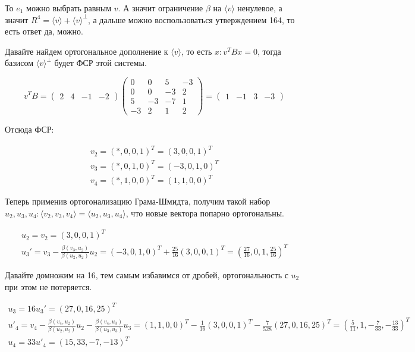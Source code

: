 \documentclass[11pt]{article}
\begin{document}
То $e_1$ можно выбрать равным $v$. А значит ограничение $\beta$ на $\langle v \rangle$ ненулевое, а значит $R^4 = \langle v \rangle + \langle v \rangle^\perp$, а дальше можно воспользоваться утверждением 164, то есть ответ да, можно.

Давайте найдем ортогональное дополнение к $\langle v \rangle$, то есть $x : v^T B x = 0$, тогда базисом $\langle v \rangle^\perp$ будет ФСР этой системы.

$$
v^TB =
\begin{pmatrix}2&4&-1&-2\end{pmatrix}
\begin{pmatrix}
0 & 0 & 5 & -3\\
0 & 0 & -3 & 2\\
5 & -3 & -7 & 1\\
-3 & 2 & 1 & 2
\end{pmatrix} =
\begin{pmatrix}
1 & -1 & 3 & -3
\end{pmatrix}
$$

Отсюда ФСР:

$$
\begin{gathered}
v_2 = (*, 0, 0, 1)^T = (3, 0, 0, 1)^T\\[6pt]
v_3 = (*, 0, 1, 0)^T = (-3, 0, 1, 0)^T\\[6pt]
v_4 = (*, 1, 0, 0)^T = (1, 1, 0, 0)^T
\end{gathered}
$$

Теперь применив ортогонализацию Грама-Шмидта, получим такой набор $u_2, u_3, u_4 : \langle v_2, v_3, v_4 \rangle = \langle u_2, u_3, u_4 \rangle$, что новые вектора попарно ортогональны.

$$
\begin{gathered}
u_2 = v_2 = (3, 0, 0, 1)^T\\[6pt]
u_3' = v_3 - \frac{\beta(v_3, u_2)}{\beta(u_2, u_2)}u_2 = (-3, 0, 1, 0)^T + \frac{25}{16}(3, 0, 0, 1)^T = (\frac{27}{16}, 0, 1, \frac{25}{16})^T
\end{gathered}
$$

Давайте домножим на 16, тем самым избавимся от дробей, ортогональность с $u_2$ при этом не потеряется.

$$
\begin{gathered}
u_3 = 16u_3' = (27, 0, 16, 25)^T\\[6pt]
u'_4 = v_4 - \frac{\beta(v_4, u_2)}{\beta(u_2, u_2)}u_2 - \frac{\beta(v_4, u_3)}{\beta(u_3, u_3)}u_3 = (1, 1, 0, 0)^T - \frac{1}{16}(3, 0, 0, 1)^T - \frac{7}{528}(27, 0, 16, 25)^T = (\frac{5}{11}, 1, -\frac{7}{33}, -\frac{13}{33})^T\\[6pt]
u_4 = 33u'_4 = (15, 33, -7, -13)^T
\end{gathered}
$$
\end{document}
